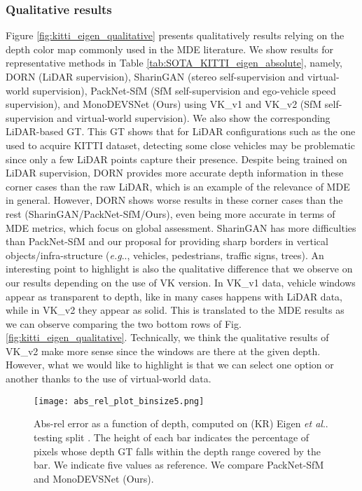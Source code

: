 \documentclass[journal]{IEEEtran}
\makeatletter
\DeclareRobustCommand\onedot{\futurelet\@let@token\@onedot}
\def\@onedot{\ifx\@let@token.\else.\null\fi\xspace}
\def\eg{\emph{e.g}\onedot} \def\Eg{\emph{E.g}\onedot}
\def\etal{\emph{et al}\onedot}
\newcommand{\Fig}[1]{Fig. \ref{fig:#1}}
\newcommand{\Tab}[1]{Table \ref{tab:#1}}
\makeatother
\begin{document}
\subsubsection{Qualitative results}
Figure \ref{fig:kitti_eigen_qualitative} presents qualitatively results relying on the depth color map commonly used in the MDE literature. We show results for representative methods in \Tab{SOTA_KITTI_eigen_absolute}, namely, DORN (LiDAR supervision), SharinGAN (stereo self-supervision and virtual-world supervision), PackNet-SfM (SfM self-supervision and ego-vehicle speed supervision), and MonoDEVSNet (Ours) using VK\_v1 and VK\_v2 (SfM self-supervision and virtual-world supervision). We also show the corresponding LiDAR-based GT. This GT shows that for LiDAR configurations such as the one used to acquire KITTI dataset, detecting some close vehicles may be problematic since only a few LiDAR points capture their presence. Despite being trained on LiDAR supervision, DORN provides more accurate depth information in these corner cases than the raw LiDAR, which is an example of the relevance of MDE in general. However, DORN shows worse results in these corner cases than the rest (SharinGAN/PackNet-SfM/Ours), even being more accurate in terms of MDE metrics, which focus on global assessment. SharinGAN has more difficulties than PackNet-SfM and our proposal for providing sharp borders in vertical objects/infra-structure ({\eg}, vehicles, pedestrians, traffic signs, trees). An interesting point to highlight is also the qualitative difference that we observe on our results depending on the use of VK version. In VK\_v1 data, vehicle windows appear as transparent to depth, like in many cases happens with LiDAR data, while in VK\_v2 they appear as solid. This is translated to the MDE results as we can observe comparing the two bottom rows of \Fig{kitti_eigen_qualitative}. Technically, we think the qualitative results of VK\_v2 make more sense since the windows are there at the given depth. However, what we would like to highlight is that we can select one option or another thanks to the use of virtual-world data. 

\begin{figure}
    \centering
    \texttt{[image: abs\_rel\_plot\_binsize5.png]}
    \caption{Abs-rel error as a function of depth, computed on (KR) Eigen {\etal} testing split \cite{Eigen:2014}. The height of each bar indicates the percentage of pixels whose depth GT falls within the depth range covered by the bar. We indicate five values as reference. We compare PackNet-SfM and MonoDEVSNet (Ours). }
    \label{fig:depth_error_as_a_function_of_depth}
\end{figure}
\end{document}
